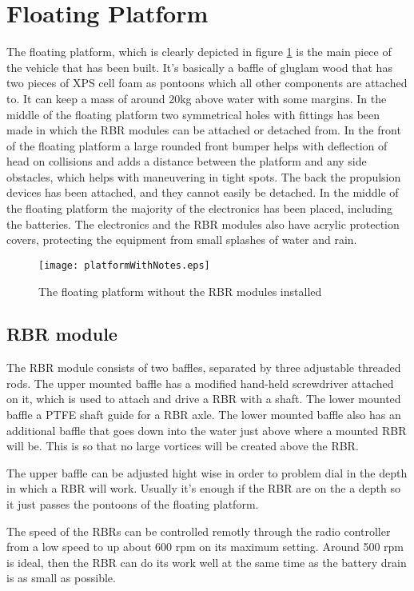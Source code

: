 \section{Floating Platform}
The floating platform, which is clearly depicted in figure \ref{fig:floatingPlatform} is the main piece of the vehicle that has been built. It's basically a baffle of gluglam wood that has two pieces of XPS cell foam as pontoons which all other components are attached to. It can keep a mass of around 20kg above water with some margins. In the middle of the floating platform two symmetrical holes with fittings has been made in which the RBR modules can be attached or detached from. In the front of the floating platform a large rounded front bumper helps with deflection of head on collisions and adds a distance between the platform and any side obstacles, which helps with maneuvering in tight spots. The back the propulsion devices has been attached, and they cannot easily be detached. In the middle of the floating platform the majority of the electronics has been placed, including the batteries. The electronics and the RBR modules also have acrylic protection covers, protecting the equipment from small splashes of water and rain.
\begin{figure}[h]
   \centering
   \texttt{[image: platformWithNotes.eps]}
   \caption{The floating platform without the RBR modules installed}
   \label{fig:floatingPlatform}
\end{figure}           

\subsection{RBR module}
The RBR module consists of two baffles, separated by three adjustable threaded rods. The upper mounted baffle has a modified hand-held screwdriver attached on it, which is used to attach and drive a RBR with a shaft. The lower mounted baffle a PTFE shaft guide for a RBR axle. The lower mounted baffle also has an additional baffle that goes down into the water just above where a mounted RBR will be. This is so that no large vortices will be created above the RBR. 

The upper baffle can be adjusted hight wise in order to problem dial in the depth in which a RBR will work. Usually it's enough if the RBR are on the a depth so it just passes the pontoons of the floating platform.

The speed of the RBRs can be controlled remotly through the radio controller from a low speed to up about 600 rpm on its maximum setting. Around 500 rpm is ideal, then the RBR can do its work well at the same time as the battery drain is as small as possible. 


